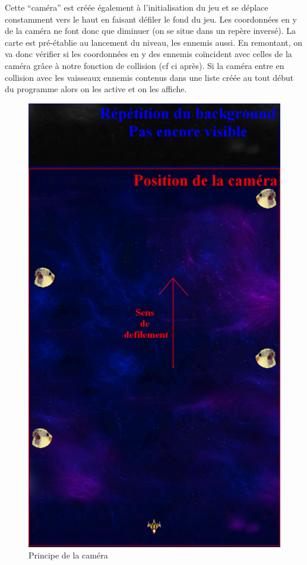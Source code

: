 \documentclass[a4paper, 12pt]{report}
\begin{document}
\noindent Cette ``caméra''  est créée également à l'initialisation du jeu et se
déplace constamment vers le haut en faisant défiler le fond du jeu. Les
coordonnées en y de la caméra ne font donc que diminuer (on se situe dans un
repère inversé). La carte est pré-établie au lancement du niveau, les ennemis
aussi. En remontant, on va donc vérifier si les coordonnées en y des ennemis
coïncident avec celles de la caméra grâce à notre fonction de collision (cf ci
après). Si la caméra entre en collision avec les vaisseaux ennemis contenus
dans une liste créée au tout début du programme alors on les active et on les
affiche.\newline

\begin{figure}[!ht]
\centering
\includegraphics[scale= 0.4]{images/schema.png}
\caption{Principe de la caméra}
\end{figure}
\end{document}
